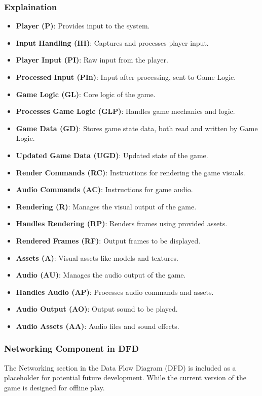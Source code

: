 \subsubsection{Explaination}
\begin{itemize}
	\item \textbf{Player (P)}: Provides input to the system.
	\item \textbf{Input Handling (IH)}: Captures and processes player input.
	\item \textbf{Player Input (PI)}: Raw input from the player.
	\item \textbf{Processed Input (PIn)}: Input after processing, sent to Game Logic.
	\item \textbf{Game Logic (GL)}: Core logic of the game.
	\item \textbf{Processes Game Logic (GLP)}: Handles game mechanics and logic.
	\item \textbf{Game Data (GD)}: Stores game state data, both read and written by Game Logic.
	\item \textbf{Updated Game Data (UGD)}: Updated state of the game.
	\item \textbf{Render Commands (RC)}: Instructions for rendering the game visuals.
	\item \textbf{Audio Commands (AC)}: Instructions for game audio.
	\item \textbf{Rendering (R)}: Manages the visual output of the game.
	\item \textbf{Handles Rendering (RP)}: Renders frames using provided assets.
	\item \textbf{Rendered Frames (RF)}: Output frames to be displayed.
	\item \textbf{Assets (A)}: Visual assets like models and textures.
	\item \textbf{Audio (AU)}: Manages the audio output of the game.
	\item \textbf{Handles Audio (AP)}: Processes audio commands and assets.
	\item \textbf{Audio Output (AO)}: Output sound to be played.
	\item \textbf{Audio Assets (AA)}: Audio files and sound effects.
\end{itemize}
\subsubsection{Networking Component in DFD}
The Networking section in the Data Flow Diagram (DFD) is included as a placeholder for potential future development. While the current version of the game is designed for offline play.
